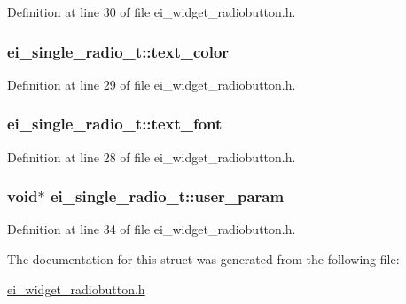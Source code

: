 Definition at line 30 of file ei\-\_\-widget\-\_\-radiobutton.\-h.

\hypertarget{structei__single__radio__t_a0db2cd323d73597028d282a2aa52bc96}{
\subsubsection[{text\-\_\-color}]{ ei\-\_\-single\-\_\-radio\-\_\-t\-::text\-\_\-color}}\label{structei__single__radio__t_a0db2cd323d73597028d282a2aa52bc96}


Definition at line 29 of file ei\-\_\-widget\-\_\-radiobutton.\-h.

\hypertarget{structei__single__radio__t_a7b60d4347f0149a0f61c5fe07f5e87ed}{
\subsubsection[{text\-\_\-font}]{ ei\-\_\-single\-\_\-radio\-\_\-t\-::text\-\_\-font}}\label{structei__single__radio__t_a7b60d4347f0149a0f61c5fe07f5e87ed}


Definition at line 28 of file ei\-\_\-widget\-\_\-radiobutton.\-h.

\hypertarget{structei__single__radio__t_a84e5f97ef7e32d46cd6f9540a46dce4a}{
\subsubsection[{user\-\_\-param}]{\setlength{\rightskip}{0pt plus 5cm}void$\ast$ ei\-\_\-single\-\_\-radio\-\_\-t\-::user\-\_\-param}}\label{structei__single__radio__t_a84e5f97ef7e32d46cd6f9540a46dce4a}


Definition at line 34 of file ei\-\_\-widget\-\_\-radiobutton.\-h.



The documentation for this struct was generated from the following file\-:\begin{DoxyCompactItemize}
\item 
\hyperlink{ei__widget__radiobutton_8h}{ei\-\_\-widget\-\_\-radiobutton.\-h}\end{DoxyCompactItemize}
